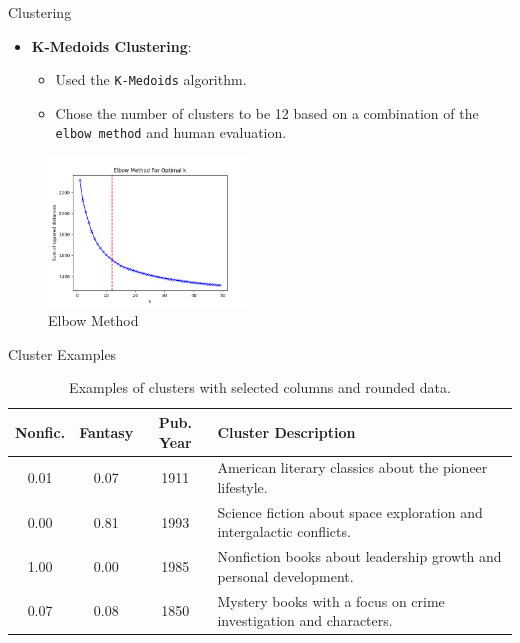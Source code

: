 \documentclass{beamer}
\begin{document}
\begin{frame}{Clustering}
    \begin{itemize}
        \item \textbf{K-Medoids Clustering}:
            \begin{itemize}
                \item Used the \texttt{K-Medoids} algorithm.
                \item Chose the number of clusters to be 12 based on a combination of the \texttt{elbow method} and human evaluation.
            \end{itemize}
    \end{itemize}
    \begin{figure}
        \centering
        \includegraphics[width=0.47\textwidth]{../output/elbow_method_0.png}
        \caption{Elbow Method}
    \end{figure}
\end{frame}

\begin{frame}{Cluster Examples}
\begin{table}[]
\centering
\begin{tabular}{|c|c|c|p{6cm}|}
\hline
\textbf{Nonfic.} & \textbf{Fantasy} & \textbf{Pub. Year} & \textbf{Cluster Description} \\ \hline
0.01                & 0.07             & 1911                  & American literary classics about the pioneer lifestyle.     \\ \hline
0.00                & 0.81             & 1993                  & Science fiction about space exploration and intergalactic conflicts. \\ \hline
1.00                & 0.00             & 1985                  & Nonfiction books about leadership growth and personal development. \\ \hline
0.07                & 0.08             & 1850                  & Mystery books with a focus on crime investigation and characters. \\ \hline
\end{tabular}
\caption{Examples of clusters with selected columns and rounded data.}
\end{table}
\end{frame}
\end{document}
